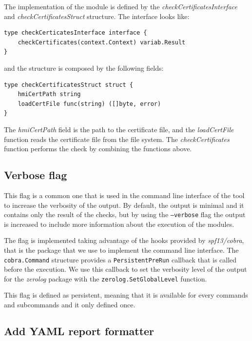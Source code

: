 The implementation of the module is defined by the \textit{checkCertificatesInterface} and \textit{checkCertificatesStruct} structure. The interface looks like:

\begin{lstlisting}[style=golang]
type checkCerticatesInterface interface {
	checkCertificates(context.Context) variab.Result
}
\end{lstlisting}

and the structure is composed by the following fields:

\begin{lstlisting}[style=golang]
type checkCertificatesStruct struct {
	hmiCertPath string
	loadCertFile func(string) ([]byte, error)
}
\end{lstlisting}

The \textit{hmiCertPath} field is the path to the certificate file, and the \textit{loadCertFile} function reads the certificate file from the file system. The \textit{checkCertificates} function performs the check by combining the functions above.

\subsection{Verbose flag}

This flag is a common one that is used in the command line interface of the tool to increase the verbosity of the output. By default, the output is minimal and it contains only the result of the checks, but by using the \texttt{--verbose} flag the output is increased to include more information about the execution of the modules.

The flag is implemented taking advantage of the hooks provided by \textit{spf13/cobra}, that is the package that we use to implement the command line interface. The \texttt{cobra.Command} structure provides a \texttt{PersistentPreRun} callback that is called before the execution. We use this callback to set the verbosity level of the output for the \textit{zerolog} package with the \texttt{zerolog.SetGlobalLevel} function.

This flag is defined as persistent, meaning that it is available for every commands and subcommands and it only defined once.

\subsection{Add YAML report formatter}

